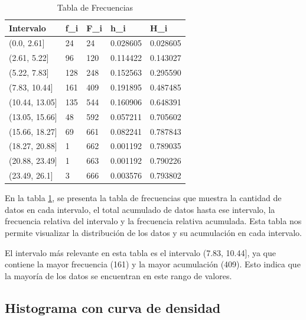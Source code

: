 \begin{table}[htbp]
    \centering
    \caption{Tabla de Frecuencias}
    \begin{tabular}{lllll}
        \hline
        \textbf{Intervalo} & \textbf{f\_i} & \textbf{F\_i} & \textbf{h\_i} & \textbf{H\_i} \\
        \hline
        (0.0, 2.61]        & 24            & 24            & 0.028605      & 0.028605      \\
        (2.61, 5.22]       & 96            & 120           & 0.114422      & 0.143027      \\
        (5.22, 7.83]       & 128           & 248           & 0.152563      & 0.295590      \\
        (7.83, 10.44]      & 161           & 409           & 0.191895      & 0.487485      \\
        (10.44, 13.05]     & 135           & 544           & 0.160906      & 0.648391      \\
        (13.05, 15.66]     & 48            & 592           & 0.057211      & 0.705602      \\
        (15.66, 18.27]     & 69            & 661           & 0.082241      & 0.787843      \\
        (18.27, 20.88]     & 1             & 662           & 0.001192      & 0.789035      \\
        (20.88, 23.49]     & 1             & 663           & 0.001192      & 0.790226      \\
        (23.49, 26.1]      & 3             & 666           & 0.003576      & 0.793802      \\
        \hline
    \end{tabular}
    \label{tab:tabla_frecuencias}
\end{table}

En la tabla \ref{tab:tabla_frecuencias}, se presenta la tabla de frecuencias
que muestra la cantidad de datos en cada intervalo, el total acumulado de datos
hasta ese intervalo, la frecuencia relativa del intervalo y la frecuencia
relativa acumulada. Esta tabla nos permite visualizar la distribución de los
datos y su acumulación en cada intervalo.

El intervalo más relevante en esta tabla es el intervalo (7.83, 10.44], ya que
contiene la mayor frecuencia (161) y la mayor acumulación (409). Esto indica
que la mayoría de los datos se encuentran en este rango de valores.

\subsection{Histograma con curva de densidad}

